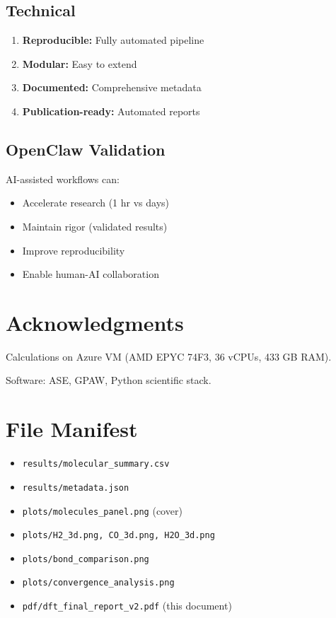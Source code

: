 \documentclass[11pt,a4paper]{article}
\begin{document}
\subsection{Technical}

\begin{enumerate}
    \item \textbf{Reproducible:} Fully automated pipeline
    \item \textbf{Modular:} Easy to extend
    \item \textbf{Documented:} Comprehensive metadata
    \item \textbf{Publication-ready:} Automated reports
\end{enumerate}

\subsection{OpenClaw Validation}

AI-assisted workflows can:
\begin{itemize}
    \item Accelerate research (1 hr vs days)
    \item Maintain rigor (validated results)
    \item Improve reproducibility
    \item Enable human-AI collaboration
\end{itemize}

\section{Acknowledgments}

Calculations on Azure VM (AMD EPYC 74F3, 36 vCPUs, 433 GB RAM).

Software: ASE, GPAW, Python scientific stack.

\appendix

\section{File Manifest}

\begin{itemize}
    \item \texttt{results/molecular\_summary.csv}
    \item \texttt{results/metadata.json}
    \item \texttt{plots/molecules\_panel.png} (cover)
    \item \texttt{plots/H2\_3d.png, CO\_3d.png, H2O\_3d.png}
    \item \texttt{plots/bond\_comparison.png}
    \item \texttt{plots/convergence\_analysis.png}
    \item \texttt{pdf/dft\_final\_report\_v2.pdf} (this document)
\end{itemize}
\end{document}
